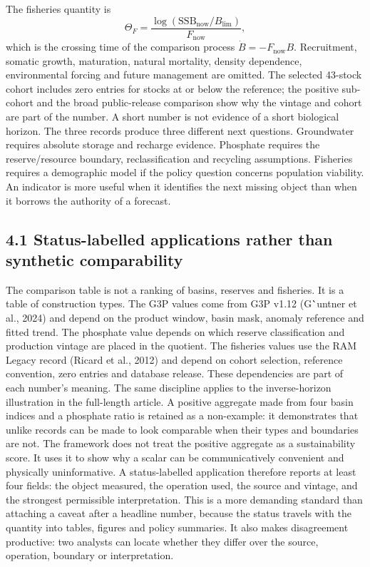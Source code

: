 \documentclass[11pt]{article}
\begin{document}
The fisheries quantity is
\[\Theta_F=\frac{\log(\mathrm{SSB}_{\mathrm{now}}/B_{\lim})}{F_{\mathrm{now}}},\]
which is the crossing time of the comparison process \(\dot B=-F_{\mathrm{now}}B\). Recruitment, somatic growth, maturation, natural mortality, density dependence, environmental forcing and future management are omitted. The selected 43-stock cohort includes zero entries for stocks at or below the reference; the positive sub-cohort and the broad public-release comparison show why the vintage and cohort are part of the number. A short number is not evidence of a short biological horizon.
The three records produce three different next questions. Groundwater requires absolute storage and recharge evidence. Phosphate requires the reserve/resource boundary, reclassification and recycling assumptions. Fisheries requires a demographic model if the policy question concerns population viability. An indicator is more useful when it identifies the next missing object than when it borrows the authority of a forecast.
\subsection{4.1 Status-labelled applications rather than synthetic comparability}
The comparison table is not a ranking of basins, reserves and fisheries. It is a table of construction types. The G3P values come from G3P v1.12 (G\``untner et al., 2024) and depend on the product window, basin mask, anomaly reference and fitted trend. The phosphate value depends on which reserve classification and production vintage are placed in the quotient. The fisheries values use the RAM Legacy record (Ricard et al., 2012) and depend on cohort selection, reference convention, zero entries and database release. These dependencies are part of each number's meaning.
The same discipline applies to the inverse-horizon illustration in the full-length article. A positive aggregate made from four basin indices and a phosphate ratio is retained as a non-example: it demonstrates that unlike records can be made to look comparable when their types and boundaries are not. The framework does not treat the positive aggregate as a sustainability score. It uses it to show why a scalar can be communicatively convenient and physically uninformative.
A status-labelled application therefore reports at least four fields: the object measured, the operation used, the source and vintage, and the strongest permissible interpretation. This is a more demanding standard than attaching a caveat after a headline number, because the status travels with the quantity into tables, figures and policy summaries. It also makes disagreement productive: two analysts can locate whether they differ over the source, operation, boundary or interpretation.
\end{document}
